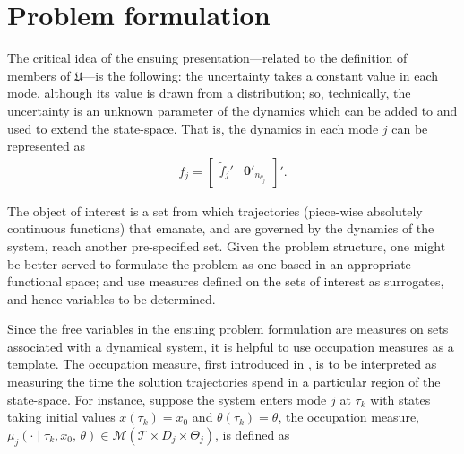 \section{Problem formulation}
\label{sec:prob}
The critical idea of the ensuing presentation---related to the definition of members of $\mathfrak U$---is the following: the uncertainty takes a constant value in each mode, although its value is drawn from a distribution; so, technically, the uncertainty is an unknown parameter of the dynamics which can be added to and used to extend the state-space. That is, the dynamics in each mode $j$ can be represented as
\begin{align}
f_j=\begin{bmatrix}
  \tilde f_j'&\mathbf{0}'_{n_{\theta_j}}
\end{bmatrix}'.
\end{align}
\par
The object of interest is a set from which trajectories (piece-wise absolutely continuous functions) that emanate, and are governed by the dynamics of the system, reach another pre-specified set. Given the problem structure, one might be better served to formulate the problem as one based in an appropriate functional space; and use measures defined on the sets of interest as surrogates, and hence variables to be determined.
\par
Since the free variables in the ensuing problem formulation are measures on sets associated with a dynamical system, it is helpful to use occupation measures as a template. The occupation measure, first introduced in \cite{Pitman1977}, is to be interpreted as measuring the time the solution trajectories spend in a particular region of the state-space. For instance, suppose the system enters mode $j$ at $\tau_k$ with states taking initial values $x(\tau_k)=x_0$ and $\theta(\tau_k)=\theta$, the occupation measure, \mbox{$\mu_j(\cdot\mid \tau_k,x_0,\,\theta)\in \mathcal M(\mathcal T\times D_j\times \Theta_j)$}, is defined as

